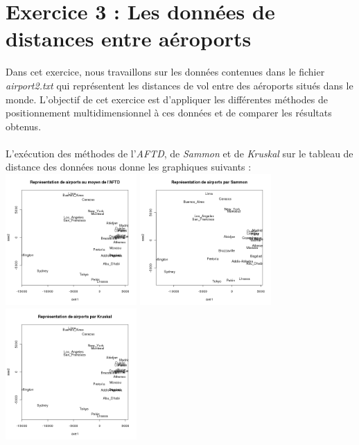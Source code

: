 \documentclass[a4paper, 10pt]{article}
\begin{document}
\section*{Exercice 3 : Les données de distances entre aéroports}
Dans cet exercice, nous travaillons sur les données contenues dans le fichier \textit{airport2.txt} qui représentent les distances de vol
entre des aéroports situés dans le monde. L'objectif de cet exercice est d'appliquer les différentes méthodes
de positionnement multidimensionnel à ces données et de comparer les résultats obtenus.\\ \\
L'exécution des méthodes de l'\textit{AFTD}, de \textit{Sammon} et de \textit{Kruskal} sur le tableau de distance des données
nous donne les graphiques suivants :\\
\includegraphics[height = 5cm, width = 5cm]{plots/plot_airports_cmdscale.png}
\includegraphics[height = 5cm, width = 5cm]{plots/plot_airports_sammon.png}
\includegraphics[height = 5cm, width = 5cm]{plots/plot_airports_kruskal.png}\\ \\
\end{document}
